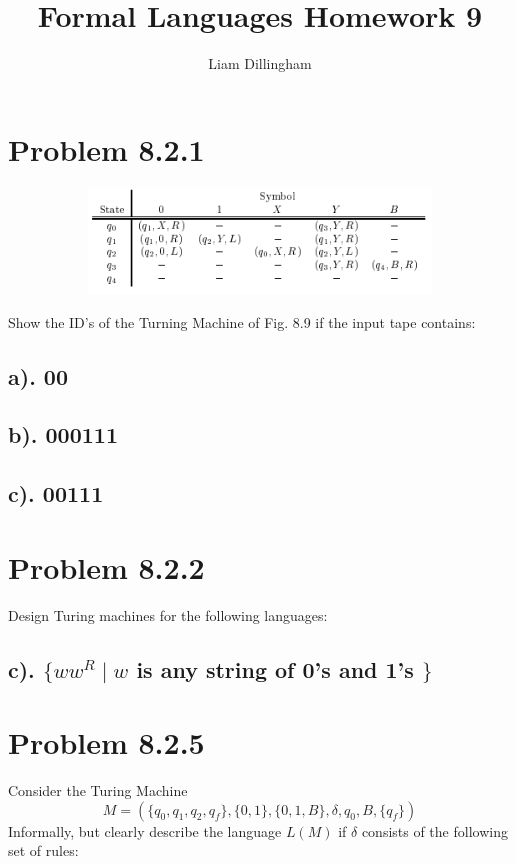 \documentclass[20pt]{article} %
\title{Formal Languages Homework 9}
\author{Liam Dillingham}
\begin{document}
\maketitle

\section{Problem 8.2.1}
\begin{figure}[!htbp]
  	\centering
   	\begin{subfigure}[p]{0.7\linewidth}
    	\includegraphics[width=\linewidth]{./figures/HW9fig1.png}
   	\end{subfigure}
\end{figure} 
Show the ID's of the Turning Machine of Fig. 8.9 if the input tape contains:
\subsection{a). 00}
\subsection{b). 000111}
\subsection{c). 00111}
\section{Problem 8.2.2}
Design Turing machines for the following languages:
\subsection{c). $\{ww^{R} \mid w $ is any string of 0's and 1's $\}$}
\section{Problem 8.2.5}
Consider the Turing Machine
$$M = ( \{q_0, q_1, q_2, q_f\}, \{0,1\}, \{0,1,B\}, \delta, q_0, B, \{q_f\})$$
Informally, but clearly describe the language $L(M)$ if $\delta$ consists of the following set of rules:
\end{document}
